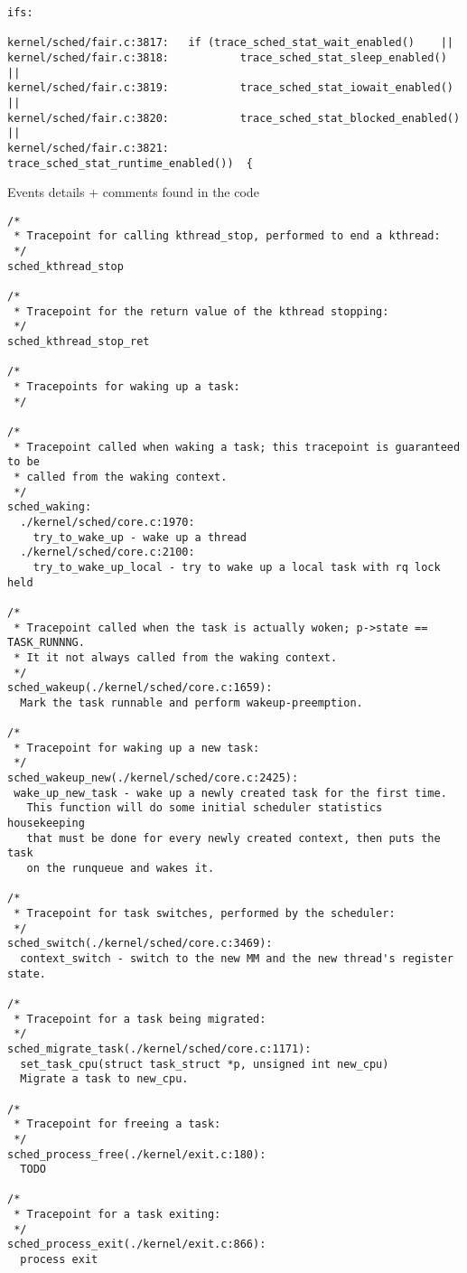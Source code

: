 \begin{Verbatim}[xleftmargin=-2cm,fontsize=\footnotesize]
ifs:

kernel/sched/fair.c:3817:	if (trace_sched_stat_wait_enabled()    ||
kernel/sched/fair.c:3818:			trace_sched_stat_sleep_enabled()   ||
kernel/sched/fair.c:3819:			trace_sched_stat_iowait_enabled()  ||
kernel/sched/fair.c:3820:			trace_sched_stat_blocked_enabled() ||
kernel/sched/fair.c:3821:			trace_sched_stat_runtime_enabled())  {
\end{Verbatim}
Events details + comments found in the code
\begin{Verbatim}
/*
 * Tracepoint for calling kthread_stop, performed to end a kthread:
 */
sched_kthread_stop

/*
 * Tracepoint for the return value of the kthread stopping:
 */
sched_kthread_stop_ret

/*
 * Tracepoints for waking up a task:
 */

/*
 * Tracepoint called when waking a task; this tracepoint is guaranteed to be
 * called from the waking context.
 */
sched_waking:
  ./kernel/sched/core.c:1970:
    try_to_wake_up - wake up a thread
  ./kernel/sched/core.c:2100:
    try_to_wake_up_local - try to wake up a local task with rq lock held

/*
 * Tracepoint called when the task is actually woken; p->state == TASK_RUNNNG.
 * It it not always called from the waking context.
 */
sched_wakeup(./kernel/sched/core.c:1659):
  Mark the task runnable and perform wakeup-preemption.

/*
 * Tracepoint for waking up a new task:
 */
sched_wakeup_new(./kernel/sched/core.c:2425):
 wake_up_new_task - wake up a newly created task for the first time.
   This function will do some initial scheduler statistics housekeeping
   that must be done for every newly created context, then puts the task
   on the runqueue and wakes it.

/*
 * Tracepoint for task switches, performed by the scheduler:
 */
sched_switch(./kernel/sched/core.c:3469):
  context_switch - switch to the new MM and the new thread's register state.

/*
 * Tracepoint for a task being migrated:
 */
sched_migrate_task(./kernel/sched/core.c:1171):
  set_task_cpu(struct task_struct *p, unsigned int new_cpu)
  Migrate a task to new_cpu.

/*
 * Tracepoint for freeing a task:
 */
sched_process_free(./kernel/exit.c:180):
  TODO

/*
 * Tracepoint for a task exiting:
 */
sched_process_exit(./kernel/exit.c:866):
  process exit


\end{Verbatim}
